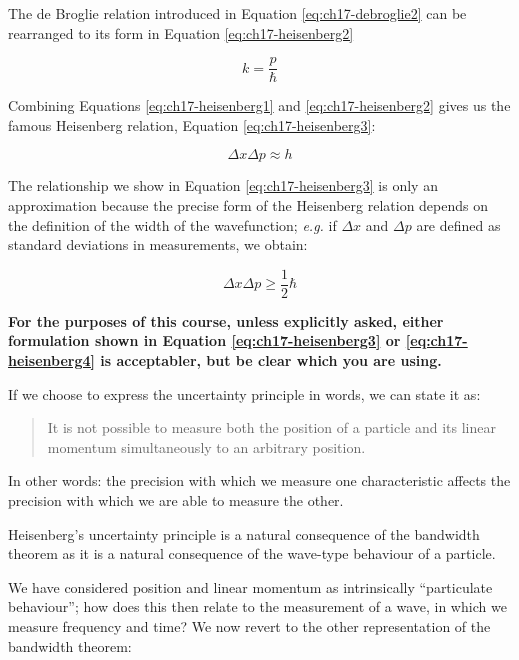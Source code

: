 \documentclass[
]{book}
\begin{document}
The de Broglie relation introduced in Equation \eqref{eq:ch17-debroglie2} can be rearranged to its form in Equation \eqref{eq:ch17-heisenberg2}

\begin{equation}
k = \frac{p}{\hbar}
\label{eq:ch17-heisenberg2}
\end{equation}

Combining Equations \eqref{eq:ch17-heisenberg1} and \eqref{eq:ch17-heisenberg2} gives us the famous Heisenberg relation, Equation \eqref{eq:ch17-heisenberg3}:

\begin{equation}
 \Delta x \Delta p \approx h
 \label{eq:ch17-heisenberg3}
\end{equation}

The relationship we show in Equation \eqref{eq:ch17-heisenberg3} is only an approximation because the precise form of the Heisenberg relation depends on the definition of the width of the wavefunction; \emph{e.g.} if \(\Delta x\) and \(\Delta p\) are defined as standard deviations in measurements, we obtain:

\begin{equation}
 \Delta x \Delta p \geq \frac{1}{2}\hbar
 \label{eq:ch17-heisenberg4}
\end{equation}

\textbf{For the purposes of this course, unless explicitly asked, either formulation shown in Equation \eqref{eq:ch17-heisenberg3} or \eqref{eq:ch17-heisenberg4} is acceptabler, but be clear which you are using.}

If we choose to express the uncertainty principle in words, we can state it as:

\begin{quote}
It is not possible to measure both the position of a particle and its linear momentum simultaneously to an arbitrary position.
\end{quote}

In other words: the precision with which we measure one characteristic affects the precision with which we are able to measure the other.

Heisenberg's uncertainty principle is a natural consequence of the bandwidth theorem as it is a natural consequence of the wave-type behaviour of a particle.

We have considered position and linear momentum as intrinsically ``particulate behaviour''; how does this then relate to the measurement of a wave, in which we measure frequency and time? We now revert to the other representation of the bandwidth theorem:
\end{document}
